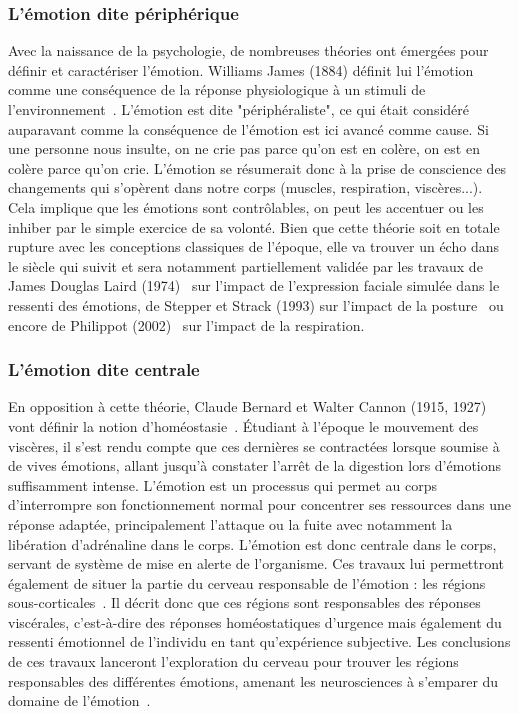 \subsubsection{L'émotion dite périphérique}
Avec la naissance de la psychologie, de nombreuses théories ont émergées pour définir et caractériser l'émotion. Williams James (1884) définit lui l'émotion comme une conséquence de la réponse physiologique à un stimuli de l'environnement~\cite{James1884}. L'émotion est dite "périphéraliste", ce qui était considéré auparavant comme la conséquence de l’émotion est ici avancé comme cause. Si une personne nous insulte, on ne crie pas parce qu'on est en colère, on est en colère parce qu'on crie. L'émotion se résumerait donc à la prise de conscience des changements qui s'opèrent dans notre corps (muscles, respiration, viscères...). Cela implique que les émotions sont contrôlables, on peut les accentuer ou les inhiber par le simple exercice de sa volonté. Bien que cette théorie soit en totale rupture avec les conceptions classiques de l'époque, elle va trouver un écho dans le siècle qui suivit et sera notamment partiellement validée par les travaux de James Douglas Laird (1974)~\cite{Laird1974} sur l'impact de l'expression faciale simulée dans le ressenti des émotions, de Stepper et Strack (1993) sur l'impact de la posture~\cite{Stepper1993} ou encore de Philippot (2002)~\cite{Philippot2002} sur l'impact de la respiration.

\subsubsection{L'émotion dite centrale}
En opposition à cette théorie, Claude Bernard et Walter Cannon (1915, 1927) vont définir la notion d’homéostasie~\cite{Cannon1915,Cannon1927}. Étudiant à l'époque le mouvement des viscères, il s'est rendu compte que ces dernières se contractées lorsque soumise à de vives émotions, allant jusqu'à constater l'arrêt de la digestion lors d'émotions suffisamment intense. L'émotion est un processus qui permet au corps d'interrompre son fonctionnement normal pour concentrer ses ressources dans une réponse adaptée, principalement l'attaque ou la fuite avec notamment la libération d'adrénaline dans le corps. L'émotion est donc centrale dans le corps, servant de système de mise en alerte de l'organisme.
Ces travaux lui permettront également de situer la partie du cerveau responsable de l'émotion : les régions sous-corticales~\cite{Cannon1933}. Il décrit donc que ces régions sont responsables des réponses viscérales, c'est-à-dire des réponses homéostatiques d'urgence mais également du ressenti émotionnel de l'individu en tant qu'expérience subjective.
Les conclusions de ces travaux lanceront l'exploration du cerveau pour trouver les régions responsables des différentes émotions, amenant les neurosciences à s'emparer du domaine de l'émotion~\cite{Bard1934}.

